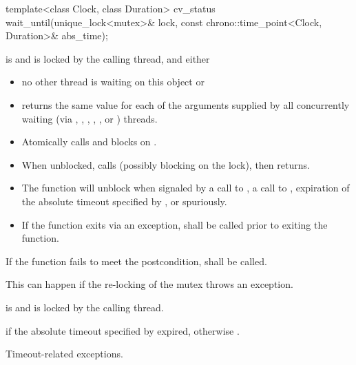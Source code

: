 %
\begin{itemdecl}
template<class Clock, class Duration>
  cv_status wait_until(unique_lock<mutex>& lock,
                       const chrono::time_point<Clock, Duration>& abs_time);
\end{itemdecl}
\begin{itemdescr}
 \pnum \requires {} is  and 
        is locked by the calling thread, and either
        \begin{itemize}
         \item no other thread is waiting on this  object or
         \item {} returns the same value for each of the 
                arguments supplied by all concurrently waiting (via ,
                , 
                {\color{insertcolor}, , , or }) threads.
        \end{itemize}

 \pnum \effects
        \begin{itemize}
         \item Atomically calls  and blocks on .

         \item When unblocked, calls  (possibly blocking on the lock), then returns.

         \item The function will unblock when signaled by a call to , a call to ,
                expiration of the absolute timeout specified by ,
                or spuriously.

         \item If the function exits via an exception,  shall be called prior to exiting the function.
        \end{itemize}

 \pnum \remarks
        If the function fails to meet the postcondition, 
        shall be called.
        \begin{note} This can happen if the re-locking of the mutex throws an exception. \end{note}

 \pnum \postconditions {} is  and 
        is locked by the calling thread.

 \pnum \returns {} if
        the absolute timeout specified by  expired,
        otherwise .

 \pnum\throws Timeout-related exceptions.
\end{itemdescr}

